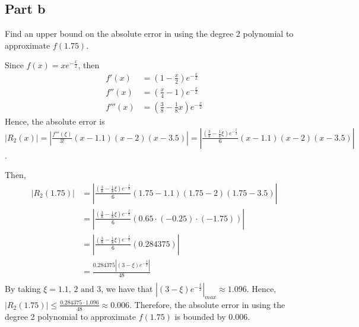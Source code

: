 \subsection{Part b}

\begin{question}
    Find an upper bound on the absolute error in using the degree 2 polynomial to approximate $f(1.75)$.
\end{question}

\begin{answer}
    Since $f(x) = xe^{-\tfrac{x}{2}}$, then 
    \begin{align}
        f'(x) &= (1-\tfrac{x}{2})e^{-\tfrac{x}{2}}\\
        f''(x) &= (\tfrac{x}{4} - 1)e^{-\tfrac{x}{2}}\\
        f'''(x) &= (\tfrac{3}{8} - \tfrac{1}{8}x)e^{-\tfrac{x}{2}}
    \end{align}
    Hence, the absolute error is $\vert R_2(x) \rvert = \left\lvert\tfrac{f'''(\xi)}{3!}(x-1.1)(x-2)(x-3.5)\right\rvert = \left\lvert\tfrac{(\tfrac{3}{8} - \tfrac{1}{8}\xi)e^{-\tfrac{\xi}{2}}}{6}(x-1.1)(x-2)(x-3.5)\right\rvert$.
    
    Then,
    \begin{align}
        \lvert R_2(1.75)\rvert &= \left\lvert\tfrac{(\tfrac{3}{8} - \tfrac{1}{8}\xi)e^{-\tfrac{\xi}{2}}}{6}(1.75-1.1)(1.75-2)(1.75-3.5)\right\rvert\\
        &= \left\lvert\tfrac{(\tfrac{3}{8} - \tfrac{1}{8}\xi)e^{-\tfrac{\xi}{2}}}{6}(0.65\cdot(-0.25)\cdot(-1.75))\right\rvert\\
        &= \left\lvert\tfrac{(\tfrac{3}{8} - \tfrac{1}{8}\xi)e^{-\tfrac{\xi}{2}}}{6}(0.284375)\right\rvert\\
        &= \tfrac{0.284375\left\lvert(3-\xi)e^{-\tfrac{\xi}{2}}\right\rvert}{48}\\
    \end{align}
    By taking $\xi = 1.1, \, 2 \text{ and } 3$, we have that ${\left\lvert(3-\xi)e^{-\tfrac{\xi}{2}}\right\rvert}_{max} \approx 1.096$.
    Hence, $\lvert R_2(1.75)\rvert \leq \tfrac{0.284375\cdot1.096}{48} \approx 0.006$. Therefore, the absolute error in using the degree 2 polynomial to approximate $f(1.75)$ is bounded by $0.006$.
\end{answer}
